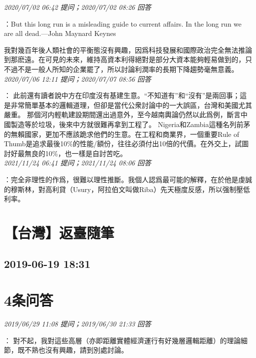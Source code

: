 \documentclass[twocolumn]{ctexart}
\begin{document}
\textit{\hfill\noindent\small 2020/07/02 06:42 提问；2020/07/02 08:26 回答}

：But this long run is a misleading guide to current affairs. In the long run we are all dead.---John Maynard Keynes

我對幾百年後人類社會的平衡態沒有興趣，因爲科技發展和國際政治完全無法推論到那麽遠。在可見的未來，維持高資本利得絕對是部分大資本能夠輕易做到的，只不過不是一般人所知的企業罷了，所以討論利潤率的長期下降趨勢毫無意義。
\\

\textit{\hfill\noindent\small 2020/07/06 12:11 提问；2020/07/07 08:56 回答}

：
此前還有讀者說中方在印度沒有基建生意。“不知道有”和“沒有”是兩回事；這是非常簡單基本的邏輯道理，但卻是當代公衆討論中的一大誤區，台灣和美國尤其嚴重。
那個河内輕軌建設期間還出過意外，至今越南輿論仍然以此爲例，斷言中國製造等於垃圾，後來中方就很難再拿到工程了。
Nigeria和Zambia這種名列前茅的無賴國家，更加不應該跪求他們的生意。在工程和商業界，一個重要Rule of Thumb是追求最後10\%的性能/額份，往往必須付出10倍的代價。在外交上，試圖討好最無良的10\%，也一樣是自討苦吃。
\\

\textit{\hfill\noindent\small 2021/11/24 06:41 提问；2021/11/24 08:06 回答}

：完全非理性的作爲，很難以理性推斷。我個人認爲最可能的解釋，在於他是虔誠的穆斯林，對高利貸（Usury，阿拉伯文叫做Riba）先天極度反感，所以强制壓低利率。
\\


\section{【台灣】返臺隨筆}
\subsection{2019-06-19 18:31}


\section{4条问答}

\textit{\hfill\noindent\small 2019/06/29 11:08 提问；2019/06/30 21:33 回答}

：
對不起，我對這些高層（亦即距離實體經濟運行有好幾層邏輯距離）的理論細節，既不熟也沒有興趣，請到別處討論。
\\
\end{document}

